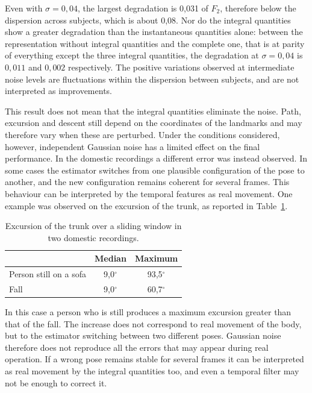 Even with \(\sigma=0{,}04\), the largest degradation is 0,031 of $F_2$, therefore below the dispersion across subjects, which is about 0,08.
Nor do the integral quantities show a greater degradation than the instantaneous quantities alone: between the representation without integral quantities and the complete one, that is at parity of everything except the three integral quantities, the degradation at $\sigma=0{,}04$ is $0{,}011$ and $0{,}002$ respectively. The positive variations observed at intermediate noise levels are fluctuations within the dispersion between subjects, and are not interpreted as improvements.

This result does not mean that the integral quantities eliminate the noise. Path, excursion and descent still depend on the coordinates of the landmarks and may therefore vary when these are perturbed. Under the conditions considered, however, independent Gaussian noise has a limited effect on the final performance. In the domestic recordings a different error was instead observed. In some cases the estimator switches from one plausible configuration of the pose to another, and the new configuration remains coherent for several frames. This behaviour can be interpreted by the temporal features as real movement. One example was observed on the excursion of the trunk, as reported in Table~\ref{tab:ambiguita}.

\begin{table}[htbp]
\centering
\caption{Excursion of the trunk over a sliding window in two domestic recordings.}
\label{tab:ambiguita}
\begin{tabular}{lcc}
\hline
 & \textbf{Median} & \textbf{Maximum} \\
\hline
Person still on a sofa & 9,0$^\circ$ & 93,5$^\circ$ \\
Fall & 9,0$^\circ$ & 60,7$^\circ$ \\
\hline
\end{tabular}
\end{table}

In this case a person who is still produces a maximum excursion greater than that of the fall. The increase does not correspond to real movement of the body, but to the estimator switching between two different poses. Gaussian noise therefore does not reproduce all the errors that may appear during real operation. If a wrong pose remains stable for several frames it can be interpreted as real movement by the integral quantities too, and even a temporal filter may not be enough to correct it.

